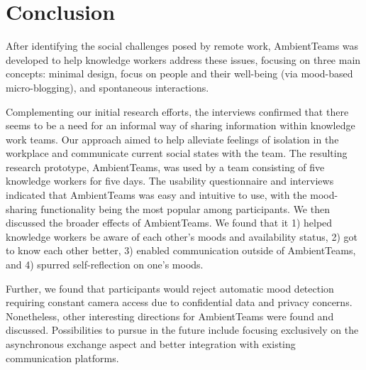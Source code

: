 \chapter{Conclusion}
\label{chapter:conclusion}
After identifying the social challenges posed by remote work, AmbientTeams was developed to help knowledge workers address these issues, focusing on three main concepts: minimal design, focus on people and their well-being (via mood-based micro-blogging), and spontaneous interactions.

Complementing our initial research efforts, the interviews confirmed that there seems to be a need for an informal way of sharing information within knowledge work teams. Our approach aimed to help alleviate feelings of isolation in the workplace and communicate current social states with the team. The resulting research prototype, AmbientTeams, was used by a team consisting of five knowledge workers for five days. The usability questionnaire and interviews indicated that AmbientTeams was easy and intuitive to use, with the mood-sharing functionality being the most popular among participants. We then discussed the broader effects of AmbientTeams. We found that it 1) helped knowledge workers be aware of each other's moods and availability status, 2) got to know each other better, 3) enabled communication outside of AmbientTeams, and 4) spurred self-reflection on one's moods.

Further, we found that participants would reject automatic mood detection requiring constant camera access due to confidential data and privacy concerns. Nonetheless, other interesting directions for AmbientTeams were found and discussed. Possibilities to pursue in the future include focusing exclusively on the asynchronous exchange aspect and better integration with existing communication platforms.